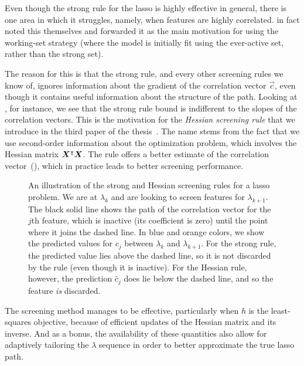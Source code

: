 Even though the strong rule for the lasso is highly effective in general, there is one area in which it struggles, namely, when features are highly correlated. \textcite{tibshirani2012} in fact noted this themselves and forwarded it as the main motivation for using the working-set strategy (where the model is initially fit using the ever-active set, rather than the strong set).

The reason for this is that the strong rule, and every other screening rules we know of, ignores information about the gradient of the correlation vector \(\vec{c}\), even though it contains useful information about the structure of the path. Looking at , for instance, we see that the strong rule bound is indifferent to the slopes of the correlation vectors. This is the motivation for the \emph{Hessian screening rule} that we introduce in the third paper of the thesis~\parencite{larsson2022b}. The name stems from the fact that we use second-order information about the optimization problem, which involves the Hessian matrix \(\boldsymbol{X}^\intercal\boldsymbol{X}\). The rule offers a better estimate of the correlation vector~(), which in practice leads to better screening performance.

\begin{figure}[tpb]
  \centering
  \pgfplotsset{width=9cm,height=7cm}
  
  \caption{%
    An illustration of the strong and Hessian screening rules for a lasso problem. We are at \(\lambda_k\) and are looking to screen features for \(\lambda_{k+1}\). The black solid line shows the path of the correlation vector for the \(j\)th feature, which is inactive (its coefficient is zero) until the point where it joins the dashed line. In blue and orange colors, we show the predicted values for \(c_j\) between \(\lambda_k\) and \(\lambda_{k+1}\). For the strong rule, the predicted value lies above the dashed line, so it is not discarded by the rule (even though it is inactive). For the Hessian rule, however, the prediction \(\hat{c}_j\) does lie below the dashed line, and so the feature \emph{is} discarded.
  }
  \label{fig:paper3-highlight}
\end{figure}

The screening method manages to be effective, particularly when \(h\) is the least-squares objective, because of efficient updates of the Hessian matrix and its inverse. And as a bonus, the availability of these quantities also allow for adaptively tailoring the \(\lambda\) sequence in order to better approximate the true lasso path.

